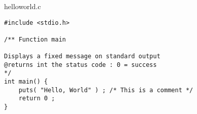 \begin{frame}[containsverbatim]
  \frametitle{\secname}
  \framesubtitle{\subsecname}
  \begin{exampleblock}{helloworld.c}
    \begin{verbatim}
#include <stdio.h>

/** Function main

Displays a fixed message on standard output
@returns int the status code : 0 = success
*/
int main() {
    puts( "Hello, World" ) ; /* This is a comment */
    return 0 ; 
}
    \end{verbatim}
  \end{exampleblock}
\end{frame}
